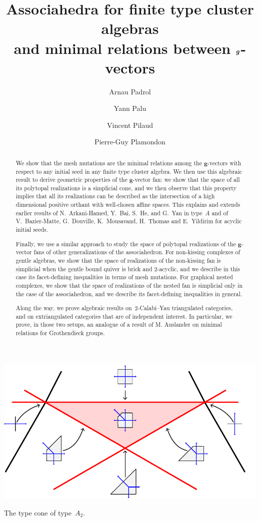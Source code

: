 \documentclass{amsart}
\title[Generalized associahedra and minimal relations between $\b{g}$-vectors]{Associahedra for finite type cluster algebras \\ and minimal relations between $\b{g}$-vectors}
\author{Arnau Padrol}
\author{Yann Palu}
\author{Vincent Pilaud}
\author{Pierre-Guy Plamondon}
\theoremstyle{definition}
\renewcommand{\b}[1]{{\boldsymbol{#1}}} %
\begin{document}
\begin{abstract}
We show that the mesh mutations are the minimal relations among the $\b{g}$-vectors with respect to any initial seed in any finite type cluster algebra.
We then use this algebraic result to derive geometric properties of the $\b{g}$-vector fan: we show that the space of all its polytopal realizations is a simplicial cone, and we then observe that this property implies that all its realizations can be described as the intersection of a high dimensional positive orthant with well-chosen affine spaces.
This explains and extends earlier results of N.~Arkani-Hamed, Y.~Bai, S.~He, and G.~Yan in type~$A$ and of V.~Bazier-Matte, G.~Douville, K.~Mousavand, H.~Thomas and E.~Yildirim for acyclic initial seeds.

Finally, we use a similar approach to study the space of polytopal realizations of the $\b{g}$-vector fans of other generalizations of the associahedron.
For non-kissing complexes of gentle algebras, we show that the space of realizations of the non-kissing fan is simplicial when the gentle bound quiver is brick and $2$-acyclic, and we describe in this case its facet-defining inequalities in terms of mesh mutations.
For graphical nested complexes, we show that the space of realizations of the nested fan is simplicial only in the case of the associahedron, and we describe its facet-defining inequalities in general.

Along the way, we prove algebraic results on~$2$-Calabi--Yau triangulated categories, and on extriangulated categories that are of independent interest.
In particular, we prove, in those two setups, an analogue of a result of M. Auslander on minimal relations for Grothendieck groups.
\end{abstract}

\maketitle

\vspace{2cm}
\centerline{\includegraphics[scale=.8]{typeConeCoarsenings}}
\vspace{.5cm}
\centerline{The type cone of type~$A_2$.}
\end{document}

